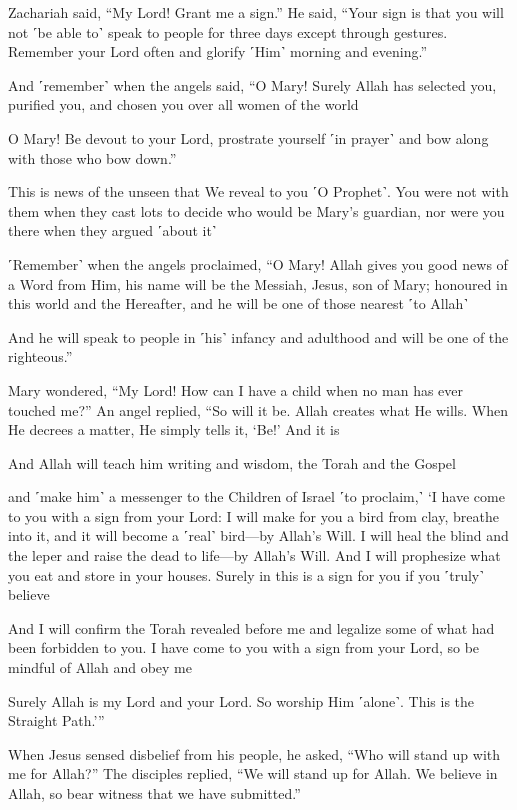 Zachariah said, “My Lord! Grant me a sign.” He said, “Your sign is that you will not ˹be able to˺ speak to people for three days except through gestures. Remember your Lord often and glorify ˹Him˺ morning and evening.”

And ˹remember˺ when the angels said, “O Mary! Surely Allah has selected you, purified you, and chosen you over all women of the world

O Mary! Be devout to your Lord, prostrate yourself ˹in prayer˺ and bow along with those who bow down.”

This is news of the unseen that We reveal to you ˹O Prophet˺. You were not with them when they cast lots to decide who would be Mary’s guardian, nor were you there when they argued ˹about it˺

˹Remember˺ when the angels proclaimed, “O Mary! Allah gives you good news of a Word from Him, his name will be the Messiah, Jesus, son of Mary; honoured in this world and the Hereafter, and he will be one of those nearest ˹to Allah˺

And he will speak to people in ˹his˺ infancy and adulthood and will be one of the righteous.”

Mary wondered, “My Lord! How can I have a child when no man has ever touched me?” An angel replied, “So will it be. Allah creates what He wills. When He decrees a matter, He simply tells it, ‘Be!’ And it is

And Allah will teach him writing and wisdom, the Torah and the Gospel

and ˹make him˺ a messenger to the Children of Israel ˹to proclaim,˺ ‘I have come to you with a sign from your Lord: I will make for you a bird from clay, breathe into it, and it will become a ˹real˺ bird—by Allah’s Will. I will heal the blind and the leper and raise the dead to life—by Allah’s Will. And I will prophesize what you eat and store in your houses. Surely in this is a sign for you if you ˹truly˺ believe

And I will confirm the Torah revealed before me and legalize some of what had been forbidden to you. I have come to you with a sign from your Lord, so be mindful of Allah and obey me

Surely Allah is my Lord and your Lord. So worship Him ˹alone˺. This is the Straight Path.’”

When Jesus sensed disbelief from his people, he asked, “Who will stand up with me for Allah?” The disciples replied, “We will stand up for Allah. We believe in Allah, so bear witness that we have submitted.”

